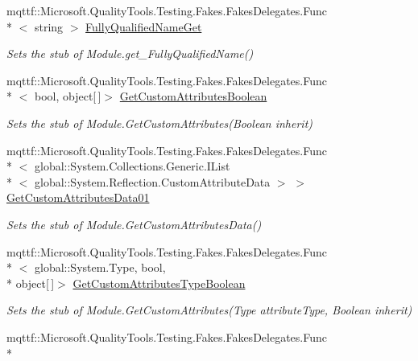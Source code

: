 \begin{DoxyCompactItemize}
mqttf\-::\-Microsoft.\-Quality\-Tools.\-Testing.\-Fakes.\-Fakes\-Delegates.\-Func\\*
$<$ string $>$ \hyperlink{class_system_1_1_reflection_1_1_fakes_1_1_stub_module_a3a7b123808a1756288c1fb7e37cc1369}{Fully\-Qualified\-Name\-Get}
\begin{DoxyCompactList}\small\item\em Sets the stub of Module.\-get\-\_\-\-Fully\-Qualified\-Name()\end{DoxyCompactList}\item 
mqttf\-::\-Microsoft.\-Quality\-Tools.\-Testing.\-Fakes.\-Fakes\-Delegates.\-Func\\*
$<$ bool, object\mbox{[}$\,$\mbox{]}$>$ \hyperlink{class_system_1_1_reflection_1_1_fakes_1_1_stub_module_ab307a6b2de4254993dc1d4213e01aa74}{Get\-Custom\-Attributes\-Boolean}
\begin{DoxyCompactList}\small\item\em Sets the stub of Module.\-Get\-Custom\-Attributes(\-Boolean inherit)\end{DoxyCompactList}\item 
mqttf\-::\-Microsoft.\-Quality\-Tools.\-Testing.\-Fakes.\-Fakes\-Delegates.\-Func\\*
$<$ global\-::\-System.\-Collections.\-Generic.\-I\-List\\*
$<$ global\-::\-System.\-Reflection.\-Custom\-Attribute\-Data $>$ $>$ \hyperlink{class_system_1_1_reflection_1_1_fakes_1_1_stub_module_ab9dd0b47de7bdbd7012fd27fa7496471}{Get\-Custom\-Attributes\-Data01}
\begin{DoxyCompactList}\small\item\em Sets the stub of Module.\-Get\-Custom\-Attributes\-Data()\end{DoxyCompactList}\item 
mqttf\-::\-Microsoft.\-Quality\-Tools.\-Testing.\-Fakes.\-Fakes\-Delegates.\-Func\\*
$<$ global\-::\-System.\-Type, bool, \\*
object\mbox{[}$\,$\mbox{]}$>$ \hyperlink{class_system_1_1_reflection_1_1_fakes_1_1_stub_module_ac83f634630701562639b5b1ac5869535}{Get\-Custom\-Attributes\-Type\-Boolean}
\begin{DoxyCompactList}\small\item\em Sets the stub of Module.\-Get\-Custom\-Attributes(\-Type attribute\-Type, Boolean inherit)\end{DoxyCompactList}\item 
mqttf\-::\-Microsoft.\-Quality\-Tools.\-Testing.\-Fakes.\-Fakes\-Delegates.\-Func\\*

\end{DoxyCompactItemize}
